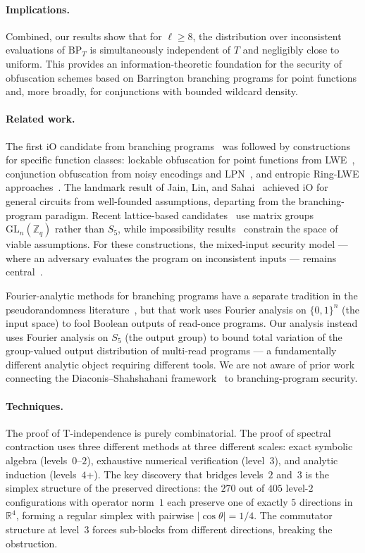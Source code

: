 \documentclass[version=submission]{iacrcc}
\newcommand{\abs}[1]{\lvert #1 \rvert}
\newcommand{\BP}{\mathrm{BP}}
\begin{document}
\paragraph{Implications.}
Combined, our results show that for $\ell \geq 8$, the distribution
over inconsistent evaluations of $\BP_T$ is simultaneously independent of
$T$ and negligibly close to uniform. This provides an information-theoretic
foundation for the security of obfuscation schemes based on Barrington branching
programs for point functions and, more broadly, for conjunctions with
bounded wildcard density.

\paragraph{Related work.}
The first iO candidate from branching programs~\cite{GGH+13} was followed
by constructions for specific function
classes: lockable obfuscation for point functions from
LWE~\cite{GKW17,WZ17}, conjunction obfuscation from noisy encodings
and LPN~\cite{BKMPRS18,BLMZ19}, and entropic Ring-LWE
approaches~\cite{BVWW16}.  The landmark result of Jain, Lin, and
Sahai~\cite{JLS21} achieved iO for general circuits from well-founded
assumptions, departing from the branching-program paradigm.  Recent
lattice-based candidates~\cite{BDGM20,WW21,HJL25} use matrix groups
$\mathrm{GL}_n(\mathbb{Z}_q)$ rather than $S_5$, while impossibility
results~\cite{DJMMV25} constrain the space of viable assumptions.
For these constructions, the mixed-input security model --- where an
adversary evaluates the program on inconsistent inputs --- remains
central~\cite{CVW18}.

Fourier-analytic methods for branching programs have a separate tradition
in the pseudorandomness literature~\cite{RSV13,LPV22}, but that
work uses Fourier analysis on $\{0,1\}^n$ (the input space) to fool
Boolean outputs of read-once programs.  Our analysis instead uses Fourier
analysis on $S_5$ (the output group) to bound total variation of the
group-valued output distribution of multi-read programs --- a fundamentally
different analytic object requiring different tools.  We are not aware of
prior work connecting the Diaconis--Shahshahani framework~\cite{DS81} to
branching-program security.

\paragraph{Techniques.}
The proof of T-independence is purely combinatorial. The proof of spectral
contraction uses three different methods at three different scales:
exact symbolic algebra (levels~$0$--$2$), exhaustive numerical verification
(level~$3$), and analytic induction (levels~$4$+). The key discovery
that bridges levels~$2$ and~$3$ is the simplex structure of the
preserved directions: the $270$ out of $405$ level-$2$ configurations
with operator norm~$1$ each preserve one of exactly $5$ directions in
$\mathbb{R}^4$, forming a regular simplex with pairwise $\abs{\cos\theta} = 1/4$.
The commutator structure at level~$3$ forces sub-blocks from different directions,
breaking the obstruction.
\end{document}
